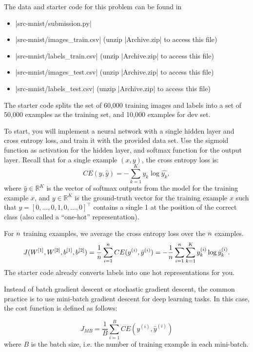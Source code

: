 The data and starter code for this problem can be found in

\begin{itemize}
\item |src-mnist/submission.py|
\item |src-mnist/images_train.csv| (unzip |Archive.zip| to access this file)
\item |src-mnist/labels_train.csv| (unzip |Archive.zip| to access this file)
\item |src-mnist/images_test.csv| (unzip |Archive.zip| to access this file)
\item |src-mnist/labels_test.csv| (unzip |Archive.zip| to access this file)
\end{itemize}

The starter code splits the set
of 60,000 training images and labels into a set of 50,000 examples as
the training set, and 10,000 examples for dev set.

To start, you will implement a neural network with a single hidden layer
and cross entropy loss, and train it with the provided data set. Use the
sigmoid function as activation for the hidden layer, and softmax function
for the output layer. Recall that for a single example $(x, y)$, the cross
entropy loss is:
$$CE(y, \hat{y}) = - \sum_{k=1}^K y_k \log \hat{y_k},$$
where $\hat{y} \in \mathbb{R}^{K}$ is the vector of softmax outputs
from the model for the training example $x$,
and $y \in \mathbb{R}^{K}$ is the ground-truth vector for the training example
$x$ such that $y = [0,...,0,1,0,...,0]^\top$ contains a single 1 at the
position of the correct class (also called a ``one-hot'' representation).

For ${n}$ training examples, we average the cross entropy loss over the ${n}$ examples.
  \begin{equation*}
  J(W^{[1]},W^{[2]},b^{[1]},b^{[2]}) = \frac{1}{{n}}\sum_{i=1}^{n} CE(y^{(i)}, \hat{y}^{(i)}) = - \frac{1}{{n}}\sum_{i=1}^{n} \sum_{k=1}^K y_k^{(i)} \log \hat{y}_k^{(i)}.
  \end{equation*}
The starter code already converts labels into one hot representations for you.

Instead of batch gradient descent or stochastic gradient descent, the common practice
is to use mini-batch gradient descent for deep learning tasks. In this case, the
cost function is defined as follows:

  \begin{equation*}
  J_{MB} = \frac{1}{B}\sum_{i=1}^{B}CE(y^{(i)}, \hat{y}^{(i)})
  \end{equation*}
where $B$ is the batch size, i.e. the number of training example in each mini-batch. 

\begin{enumerate}
  

  

  
 \end{enumerate}

